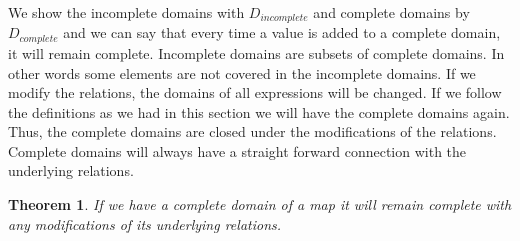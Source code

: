 \documentclass[12pt]{article}
\newtheorem{theorem}{Theorem}[section]
\begin{document}
We show the incomplete domains with $D_{incomplete}$ and complete domains by $D_{complete}$ and we can say that every time a value is added to a complete domain, it will remain complete. Incomplete domains are subsets of complete domains. In other words some elements are not covered in the incomplete domains. If we modify the relations, the domains of all expressions will be changed. If we follow the definitions as we had in this section we will have the complete domains again. Thus, the complete domains are closed under the modifications of the relations. Complete domains will always have a straight forward connection with the underlying relations.

\begin{theorem}
If we have a complete domain of a map it will remain complete with any modifications of its underlying relations.
\end{theorem}
\end{document}
